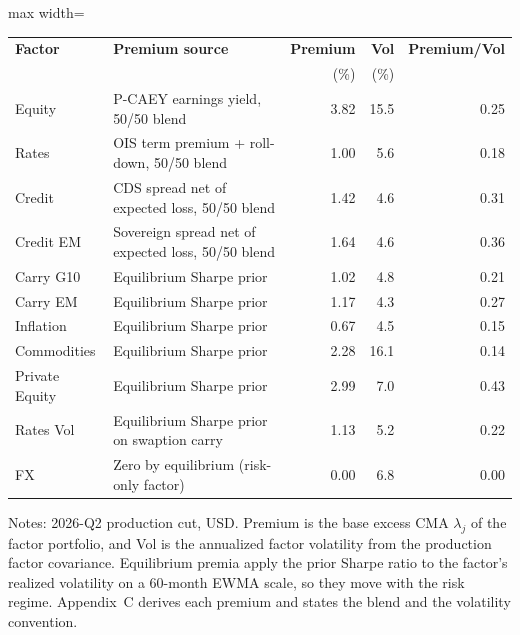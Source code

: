 \documentclass[pdftex,12pt,a4paper]{article}
\begin{document}
\begin{table}[H]
	\label{tab:nine_factors}\vspace*{-0.5\baselineskip}
	\begin{center}
		\footnotesize
		\begin{adjustbox}{max width=\textwidth}
		\begin{tabular}{l l rrr}
			\toprule
			\textbf{Factor} & \textbf{Premium source} & \textbf{Premium} & \textbf{Vol} & \textbf{Premium/Vol} \\
			& & (\%) & (\%) & \\
			\midrule
			Equity      & P-CAEY earnings yield, 50/50 blend           & 3.82 & 15.5 & 0.25 \\
			Rates       & OIS term premium + roll-down, 50/50 blend    & 1.00 & 5.6  & 0.18 \\
			Credit      & CDS spread net of expected loss, 50/50 blend & 1.42 & 4.6  & 0.31 \\
				Credit EM   & Sovereign spread net of expected loss, 50/50 blend & 1.64 & 4.6 & 0.36 \\
			Carry G10   & Equilibrium Sharpe prior                     & 1.02 & 4.8  & 0.21 \\
				Carry EM    & Equilibrium Sharpe prior                     & 1.17 & 4.3  & 0.27 \\
			Inflation   & Equilibrium Sharpe prior                     & 0.67 & 4.5  & 0.15 \\
			Commodities & Equilibrium Sharpe prior                     & 2.28 & 16.1 & 0.14 \\
			Private Equity & Equilibrium Sharpe prior                  & 2.99 & 7.0  & 0.43 \\
			Rates Vol   & Equilibrium Sharpe prior on swaption carry   & 1.13 & 5.2  & 0.22 \\
			FX          & Zero by equilibrium (risk-only factor)       & 0.00 & 6.8  & 0.00 \\
			\bottomrule
		\end{tabular}
		\end{adjustbox}
	\end{center}
	\vspace*{-0.5\baselineskip}
	{\footnotesize Notes: 2026-Q2 production cut, USD. Premium is the base excess CMA $\lambda_j$ of the factor portfolio, and Vol is the annualized factor volatility from the production factor covariance. Equilibrium premia apply the prior Sharpe ratio to the factor's realized volatility on a 60-month EWMA scale, so they move with the risk regime. Appendix~C derives each premium and states the blend and the volatility convention.} %
\end{table}
\end{document}
